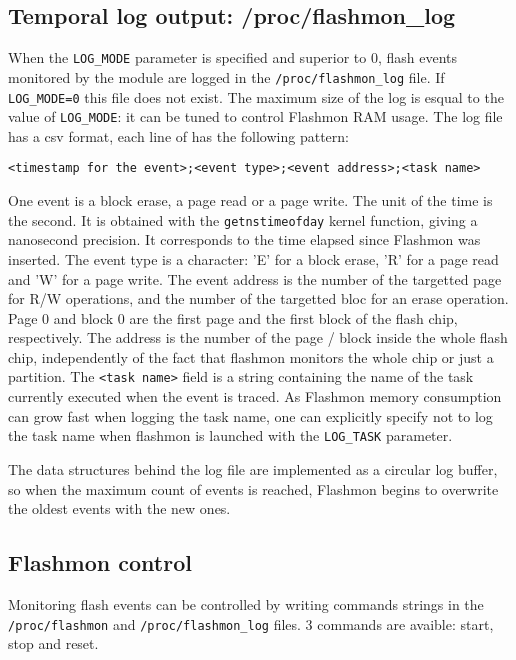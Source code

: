\documentclass[11pt]{article}
\begin{document}
\subsection{Temporal log output: /proc/flashmon\_log}

When the \verb+LOG_MODE+ parameter is specified and superior to 0, flash events monitored by the module are logged in the \verb+/proc/flashmon_log+ file. If \verb+LOG_MODE=0+ this file does not exist. The maximum size of the log is esqual to the value of \verb+LOG_MODE+: it can be tuned to control Flashmon RAM usage. The log file has a csv format, each line of has the following pattern:

\begin{verbatim}
<timestamp for the event>;<event type>;<event address>;<task name>
\end{verbatim}

One event is a block erase, a page read or a page write. The unit of the time is the second. It is obtained with the \verb+getnstimeofday+ kernel function, giving a nanosecond precision. It corresponds to the time elapsed since Flashmon was inserted. The event type is a character: 'E' for a block erase, 'R' for a page read and 'W' for a page write. The event address is the number of the targetted page for R/W operations, and the number of the targetted bloc for an erase operation. Page 0 and block 0 are the first page and the first block of the flash chip, respectively. The address is the number of the page / block inside the whole flash chip, independently of the fact that flashmon monitors the whole chip or just a partition. The \verb+<task name>+ field is a string containing the name of the task currently executed when the event is traced. As Flashmon memory consumption can grow fast when logging the task name, one can explicitly specify not to log the task name when flashmon is launched with the \verb+LOG_TASK+ parameter.

The data structures behind the log file are implemented as a circular log buffer, so when the maximum count of events is reached, Flashmon begins to overwrite the oldest events with the new ones. 

\subsection{Flashmon control}

Monitoring flash events can be controlled by writing commands strings in the \verb+/proc/flashmon+ and \verb+/proc/flashmon_log+ files. 3 commands are avaible: start, stop and reset.
\end{document}
